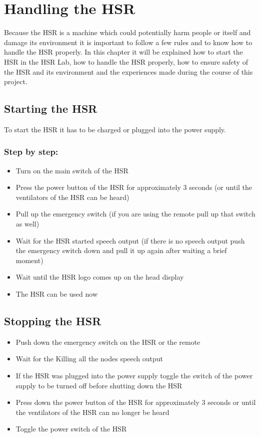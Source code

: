 \documentclass[main.tex]{subfiles}
\begin{document}
	\chapter{Handling the HSR}
	\label{workin_hsr}
	
	Because the HSR is a machine which could potentially harm people or itself and damage its environment it is important to follow a few rules and to know how to handle the HSR properly. In this chapter it will be explained how to start the HSR in the HSR Lab, how to handle the HSR properly, how to ensure safety of the HSR and its environment and the experiences made during the course of this project.

	\section{Starting the HSR}
	To start the HSR it has to be charged or plugged into the power supply.
	\subsection{Step by step:}
	\begin{itemize}
		\item Turn on the main switch of the HSR
		\item Press the power button of the HSR for approximately 3 seconds (or until the ventilators of the HSR can be heard)
		\item Pull up the emergency switch (if you are using the remote pull up that switch as well)
		\item Wait for the HSR started speech output (if there is no speech output push the emergency switch down and pull it up again after waiting a brief moment)
		\item Wait until the HSR logo comes up on the head display
		\item The HSR can be used now
	\end{itemize}
	\section{Stopping the HSR}
	\begin{itemize}
		\item Push down the emergency switch on the HSR or the remote
		\item Wait for the Killing all the nodes speech output
		\item If the HSR was plugged into the power supply toggle the switch of the power supply to be turned off before shutting down the HSR
		\item Press down the power button of the HSR for approximately 3 seconds or until the ventilators of the HSR can no longer be heard
		\item Toggle the power switch of the HSR
	\end{itemize}
\end{document}

